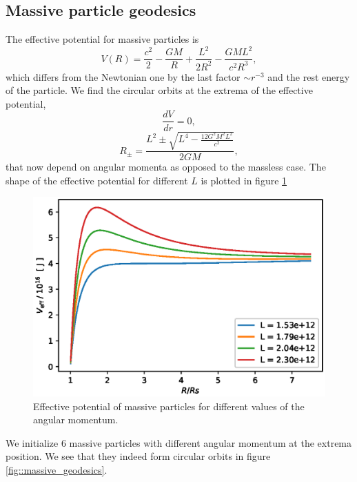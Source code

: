\documentclass[journal, a4paper]{IEEEtran}
\begin{document}
\subsection{Massive particle geodesics}
The effective potential for massive particles is
\begin{equation}
	V(R) = \frac{c^2}{2} - \frac{GM}{R} + \frac{L^2}{2R^2} - \frac{GML^2}{c^2R^3},
\end{equation}
which differs from the Newtonian one by the last factor $\sim r^{-3}$ and the rest energy of the particle. We find the circular orbits at the extrema of the effective potential,
\begin{equation}
	\frac{dV}{dr} = 0,
\end{equation}
\begin{equation}
	R_{\pm} = \frac{L^2 \pm \sqrt{ L^4 - \frac{12 G^2 M^2 L^2}{ c^2} } }{2 G M},
\end{equation}
that now depend on angular momenta as opposed to the massless case. The shape of the effective potential for different $L$ is plotted in figure \ref{fig::Veff_massive}
\begin{figure}[!hbt]
	\begin{center}
	\includegraphics[width=\columnwidth]{Veff_massive.eps}
	\caption{Effective potential of massive particles for different values of the angular momentum.}
	\label{fig::Veff_massive}
\end{center}
\end{figure}
We initialize 6 massive particles with different angular momentum at the extrema position. We see that they indeed form circular orbits in figure \ref{fig::massive_geodesics}.
\end{document}
